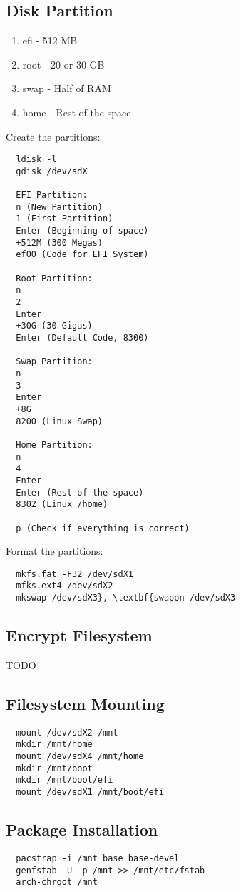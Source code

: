 \documentclass{article}
\begin{document}
\subsection{Disk Partition}
\begin{enumerate}
  \item efi - 512 MB
  \item root - 20 or 30 GB
  \item swap - Half of RAM
  \item home - Rest of the space
\end{enumerate}

Create the partitions:

\begin{lstlisting}
  ldisk -l
  gdisk /dev/sdX

  EFI Partition:
  n (New Partition)
  1 (First Partition)
  Enter (Beginning of space)
  +512M (300 Megas)
  ef00 (Code for EFI System)

  Root Partition:
  n
  2
  Enter
  +30G (30 Gigas)
  Enter (Default Code, 8300)

  Swap Partition:
  n
  3
  Enter
  +8G
  8200 (Linux Swap)

  Home Partition:
  n
  4
  Enter
  Enter (Rest of the space)
  8302 (Linux /home)

  p (Check if everything is correct)
\end{lstlisting}

Format the partitions:

\begin{lstlisting}
  mkfs.fat -F32 /dev/sdX1
  mfks.ext4 /dev/sdX2
  mkswap /dev/sdX3}, \textbf{swapon /dev/sdX3
\end{lstlisting}

\subsection{Encrypt Filesystem}
TODO

\subsection{Filesystem Mounting}
\begin{lstlisting}
  mount /dev/sdX2 /mnt
  mkdir /mnt/home
  mount /dev/sdX4 /mnt/home
  mkdir /mnt/boot
  mkdir /mnt/boot/efi
  mount /dev/sdX1 /mnt/boot/efi
\end{lstlisting}

\subsection{Package Installation}
\begin{lstlisting}
  pacstrap -i /mnt base base-devel
  genfstab -U -p /mnt >> /mnt/etc/fstab
  arch-chroot /mnt
\end{lstlisting}
\end{document}
